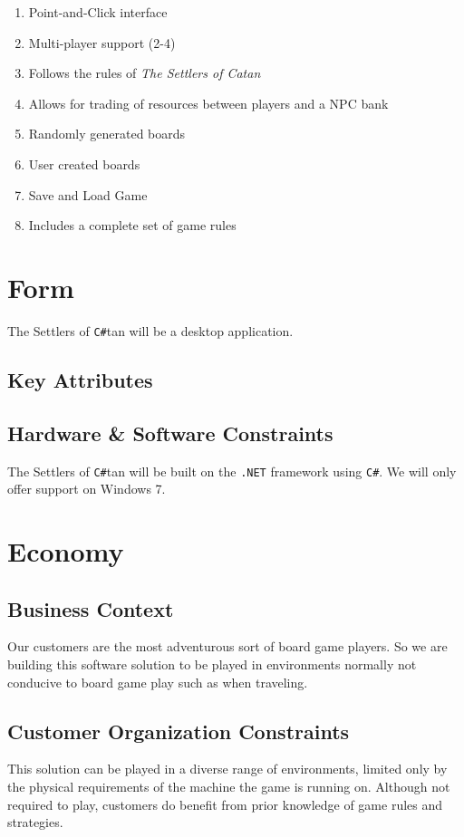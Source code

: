 \documentclass[12pt]{article}
\begin{document}
\begin{enumerate}

\item Point-and-Click interface
\item Multi-player support (2-4)
\item Follows the rules of \emph{The Settlers of Catan}
\item Allows for trading of resources between players and a NPC bank
\item Randomly generated boards
\item User created boards
\item Save and Load Game
\item Includes a complete set of game rules

\end{enumerate}

\section{Form}
The Settlers of \verb!C#!tan will be a desktop application.

\subsection{Key Attributes}

\subsection{Hardware \& Software Constraints}
 The Settlers of \verb!C#!tan will be built on the \verb!.NET! framework using \verb!C#!. We will only offer support on Windows 7.

\section{Economy}

\subsection{Business Context}
Our customers are the most adventurous sort of board game players. So we are building this software solution to be played in environments normally not conducive to board game play such as when traveling. 

\subsection{Customer Organization Constraints}
This solution can be played in a diverse range of environments, limited only by the physical requirements of the machine the game is running on. Although not required to play, customers do benefit from prior knowledge of game rules and strategies.
\end{document}
